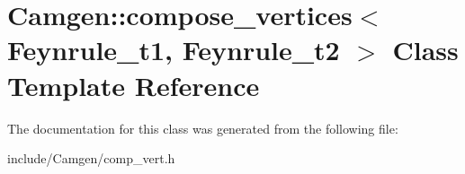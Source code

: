 \hypertarget{a00094}{}\section{Camgen\+:\+:compose\+\_\+vertices$<$ Feynrule\+\_\+t1, Feynrule\+\_\+t2 $>$ Class Template Reference}
\label{a00094}


The documentation for this class was generated from the following file\+:\begin{DoxyCompactItemize}
\item 
include/\+Camgen/comp\+\_\+vert.\+h\end{DoxyCompactItemize}

